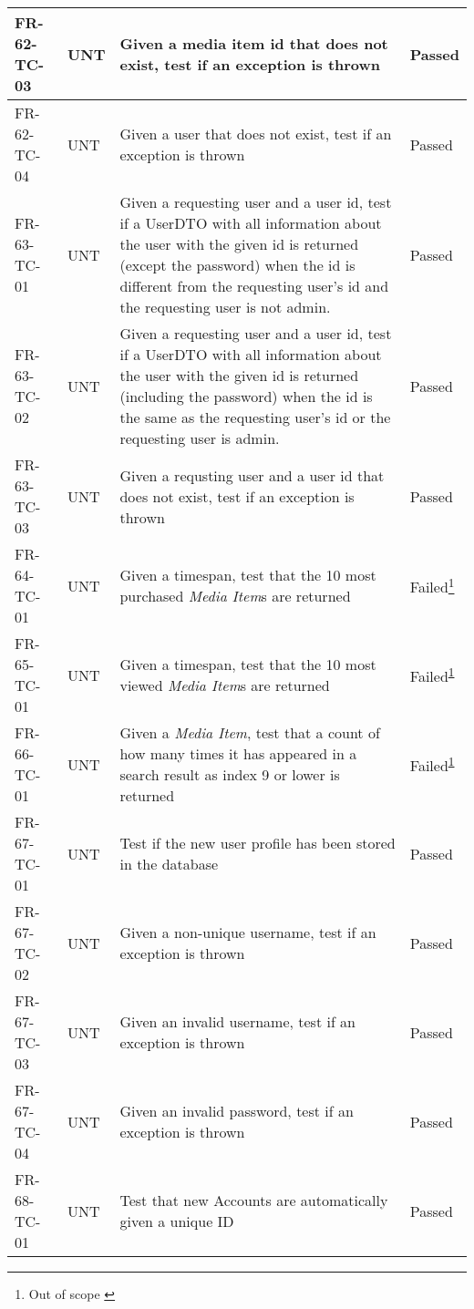 \documentclass[../report.tex]{subfiles}
\newcommand{\footnoteref}[1]{\textsuperscript{\ref{#1}}}
\begin{document}
\begin{longtable}{|L{2.1cm}|L{1cm}|L{12.4cm}|L{1.4cm}|}
FR-62-TC-03&UNT&Given a media item id that does not exist, test if an exception is thrown&Passed  \\ \hline
FR-62-TC-04&UNT&Given a user that does not exist, test if an exception is thrown&Passed  \\ \hline
FR-63-TC-01&UNT&Given a requesting user and a user id, test if a UserDTO with all information about the user with the given id is returned (except the password) when the id is different from the requesting user's id and the requesting user is not admin.&Passed  \\ \hline
FR-63-TC-02&UNT&Given a requesting user and a user id, test if a UserDTO with all information about the user with the given id is returned (including the password) when the id is the same as the requesting user's id or the requesting user is admin.&Passed  \\ \hline
FR-63-TC-03&UNT&Given a requsting user and a user id that does not exist, test if an exception is thrown&Passed  \\ \hline
FR-64-TC-01 & UNT & Given a timespan, test that the 10 most purchased \textit{Media Item}s are returned & Failed\footnote{Out of scope \label{note2}}  \\ \hline
FR-65-TC-01 & UNT & Given a timespan, test that the 10 most viewed \textit{Media Item}s are returned & Failed\footnoteref{note2}  \\ \hline
FR-66-TC-01 & UNT & Given a \textit{Media Item}, test that a count of how many times it has appeared in a search result as index 9 or lower is returned & Failed\footnoteref{note2}  \\ \hline
FR-67-TC-01&UNT&Test if the new user profile has been stored in the database&Passed  \\ \hline
FR-67-TC-02&UNT&Given a non-unique username, test if an exception is thrown&Passed  \\ \hline
FR-67-TC-03&UNT&Given an invalid username, test if an exception is thrown&Passed  \\ \hline
FR-67-TC-04&UNT&Given an invalid password, test if an exception is thrown&Passed  \\ \hline
FR-68-TC-01&UNT&Test that new Accounts are automatically given a unique ID&Passed  \\ \hline

\end{longtable}
\end{document}
